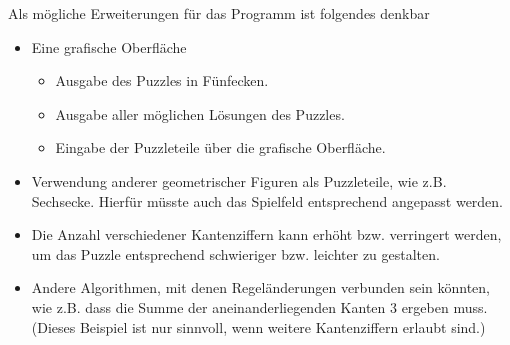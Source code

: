 Als mögliche Erweiterungen für das Programm ist folgendes denkbar
\begin{itemize}
	\item Eine grafische Oberfläche
	\begin{itemize}
		\item Ausgabe des Puzzles in Fünfecken.
		\item Ausgabe aller möglichen Lösungen des Puzzles.
		\item Eingabe der Puzzleteile über die grafische Oberfläche.
	\end{itemize}
	\item Verwendung anderer geometrischer Figuren als Puzzleteile, wie z.B. Sechsecke. Hierfür müsste auch das Spielfeld entsprechend angepasst werden.
	\item Die Anzahl verschiedener Kantenziffern kann erhöht bzw. verringert werden, um das Puzzle entsprechend schwieriger bzw. leichter zu gestalten.
	\item Andere Algorithmen, mit denen Regeländerungen verbunden sein könnten, wie z.B. dass die Summe der aneinanderliegenden Kanten 3 ergeben muss. (Dieses Beispiel ist nur sinnvoll, wenn weitere Kantenziffern erlaubt sind.)
\end{itemize}
\cleardoublepage